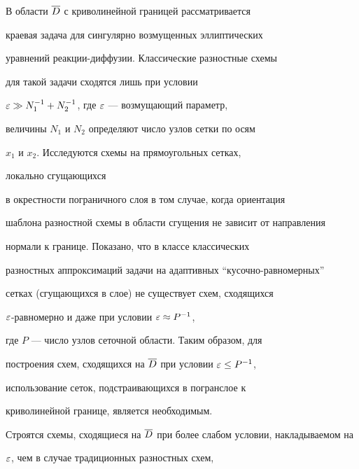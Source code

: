 \pagestyle{plain} %







\maketitle


\label{begin}








В области $\overline{D}$ с криволинейной границей рассматривается


краевая задача для сингулярно возмущенных эллиптических


уравнений реакции-диффузии. Классические разностные схемы


для такой задачи сходятся лишь при условии


$\varepsilon\gg N_1^{-1}+N_2^{-1}$, где $\varepsilon$ --- возмущающий параметр,


величины $N_1$ и $N_2$ определяют число узлов сетки по осям


$x_1$ и $x_2$. Исследуются схемы на прямоугольных сетках,


локально сгущающихся


в окрестности пограничного слоя в том случае, когда ориентация


шаблона разностной схемы в области сгущения не зависит от направления


нормали к границе. Показано, что в классе классических


разностных аппроксимаций задачи на адаптивных ``кусочно-равномерных''


сетках (сгущающихся в слое) не существует схем, сходящихся


$\varepsilon$-равномерно и даже при условии $\varepsilon \approx P^{-1}$,


где $P$ --- число узлов сеточной области. Таким образом, для


построения схем, сходящихся на $\overline{D}$ при условии $\varepsilon \le P^{-1}$,


использование сеток, подстраивающихся в погранслое к


криволинейной границе, является необходимым.


Строятся схемы, сходящиеся на $\overline{D}$ при более слабом условии, накладываемом на


$\varepsilon$, чем в случае традиционных разностных схем,



